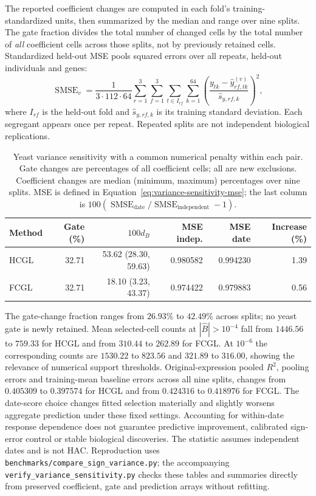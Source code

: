 \documentclass[11pt,a4paper]{article}
\begin{document}
The reported coefficient changes are computed in each fold's training-standardized
units, then summarized by the median and range over nine splits. The gate
fraction divides the total number of changed cells by the total number of
\emph{all} coefficient cells across those splits, not by previously retained
cells. Standardized held-out MSE pools squared errors over all repeats,
held-out individuals and genes:
\begin{equation}\label{eq:variance-sensitivity-mse}
 \operatorname{SMSE}_v=
 \frac{1}{3\cdot112\cdot64}
 \sum_{r=1}^{3}\sum_{f=1}^{3}\sum_{t\in I_{rf}}\sum_{k=1}^{64}
 \left(\frac{y_{tk}-\widehat y^{(v)}_{rf,tk}}{
                    \widehat s_{y,rf,k}}\right)^2,
\end{equation}
where $I_{rf}$ is the held-out fold and $\widehat s_{y,rf,k}$ is its
training standard deviation. Each segregant appears once per repeat.
Repeated splits are not independent biological replications.

\begin{table}[htbp]\centering\small
\caption{Yeast variance sensitivity with a common numerical penalty within
each pair. Gate changes are percentages of all coefficient cells; all are
new exclusions. Coefficient changes are median (minimum, maximum) percentages
over nine splits. MSE is defined in Equation~\eqref{eq:variance-sensitivity-mse};
the last column is $100(\operatorname{SMSE}_{\mathrm{date}}/
\operatorname{SMSE}_{\mathrm{independent}}-1)$.}\label{tab:variance-yeast}
\begin{tabular}{lrrrrr}\toprule
Method & Gate (\%) & $100d_B$ & MSE indep. & MSE date & Increase (\%)\\\midrule
HCGL & 32.71 & 53.62 (28.30, 59.63) & 0.980582 & 0.994230 & 1.39 \\
FCGL & 32.71 & 18.10 (3.23, 43.37) & 0.974422 & 0.979883 & 0.56 \\
\bottomrule\end{tabular}\end{table}

The gate-change fraction ranges from $26.93\%$ to $42.49\%$ across splits;
no yeast gate is newly retained. Mean selected-cell counts at
$|\widehat B|>10^{-4}$ fall from $1446.56$ to $759.33$ for HCGL and from
$310.44$ to $262.89$ for FCGL. At $10^{-6}$ the corresponding counts are
$1530.22$ to $823.56$ and $321.89$ to $316.00$, showing the relevance of
numerical support thresholds. Original-expression pooled $R^2$, pooling
errors and training-mean baseline errors across all nine splits, changes from
$0.405309$ to $0.397574$ for HCGL and from $0.424316$ to $0.418976$ for FCGL.
The date-score choice changes fitted selection materially and slightly
worsens aggregate prediction under these fixed settings. Accounting for
within-date response dependence does not guarantee predictive improvement,
calibrated sign-error control or stable biological discoveries. The statistic
assumes independent dates and is not HAC. Reproduction uses
\texttt{benchmarks/compare\_sign\_variance.py}; the accompanying
\texttt{verify\_variance\_sensitivity.py} checks these tables and summaries
directly from preserved coefficient, gate and prediction arrays without refitting.
\end{document}
